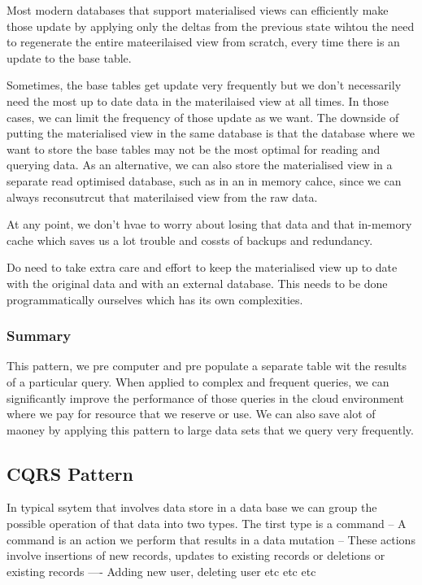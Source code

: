 \documentclass[a4paper, 11pt]{book}
\begin{document}
{    Most modern databases that support materialised views can efficiently make those update by applying only the deltas from the previous state wihtou the need to regenerate the entire mateerilaised view from scratch, every time there is an update to the base table.

    Sometimes, the base tables get update very frequently but we don't necessarily need the most up to date data in the materilaised view at all times.
    In those cases, we can limit the frequency of those update as we want.
    The downside of putting the materialised view in the same database is that the database where we want to store the base tables may not be the most optimal for reading and querying data.
    As an alternative, we can also store the materialised view in a separate read optimised database, such as in an in memory cahce, since we can always reconsutrcut that materilaised view from the raw data.

    At any point, we don't hvae to worry about losing that data and that in-memory cache which saves us a lot trouble and cossts of backups and redundancy.

    Do need to take extra care and effort to keep the materialised view up to date with the original data and with an external database.
    This needs to be done programmatically ourselves which has its own complexities.

    \subsubsection{Summary}
    This pattern, we pre computer and pre populate a separate table wit the results of a particular query.
    When applied to complex and frequent queries, we can significantly improve the performance of those queries in the cloud environment where we pay for resource that we reserve or use.
    We can also save alot of maoney by applying this pattern to large data sets that we query very frequently.

    \subsection{CQRS Pattern}
    In typical ssytem that involves data store in a data base we can group the possible operation of that data into two types.
    The tirst type is a command
    -- A command is an action we perform that results in a data mutation
    -- These actions involve insertions of new records, updates to existing records or deletions or existing records
    ---- Adding new user, deleting user etc etc etc

}
\end{document}
